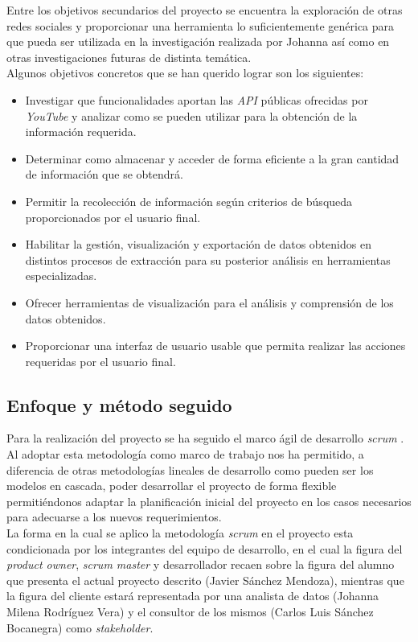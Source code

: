 \documentclass[11pt,a4paper]{article}
\begin{document}
Entre los objetivos secundarios del proyecto se encuentra la exploración de otras redes sociales y proporcionar una herramienta lo suficientemente genérica para que pueda ser utilizada en la investigación realizada por Johanna así como en otras investigaciones futuras de distinta temática.
\\

Algunos objetivos concretos que se han querido lograr son los siguientes: 
\begin{itemize}
\item Investigar que funcionalidades aportan las \textit{API} públicas ofrecidas por \textit{YouTube} y analizar como se pueden utilizar para la obtención de la información requerida.
\item Determinar como almacenar y acceder de forma eficiente a la gran cantidad de información que se obtendrá.
\item Permitir la recolección de información según criterios de búsqueda proporcionados por el usuario final.
\item Habilitar la gestión, visualización y exportación de datos obtenidos en distintos procesos de extracción para su posterior análisis en herramientas especializadas.
\item Ofrecer herramientas de visualización para el análisis y comprensión de los datos obtenidos.
\item Proporcionar una interfaz de usuario usable que permita realizar las acciones requeridas por el usuario final.
\end{itemize}
\medskip 

\subsection{Enfoque y método seguido}
Para la realización del proyecto se ha seguido el marco ágil de desarrollo \textit{scrum} \cite{8}. Al adoptar esta metodología como marco de trabajo nos ha permitido, a diferencia de otras metodologías lineales de desarrollo como pueden ser los modelos en cascada, poder desarrollar el proyecto de forma flexible permitiéndonos adaptar la planificación inicial del proyecto en los casos necesarios para adecuarse a los nuevos requerimientos.
\\

La forma en la cual se aplico la metodología \textit{scrum} en el proyecto esta condicionada por los integrantes del equipo de desarrollo, en el cual la figura del \textit{product owner}, \textit{scrum master} y desarrollador recaen sobre la figura del alumno que presenta el actual proyecto descrito (Javier Sánchez Mendoza), mientras que la figura del cliente estará representada por una analista de datos (Johanna Milena Rodríguez Vera) y el consultor de los mismos (Carlos Luis Sánchez Bocanegra) como \textit{stakeholder}.
\\
\end{document}

